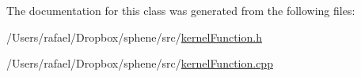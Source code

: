 The documentation for this class was generated from the following files\+:\begin{DoxyCompactItemize}
\item 
/\+Users/rafael/\+Dropbox/sphene/src/\hyperlink{kernelFunction_8h}{kernel\+Function.\+h}\item 
/\+Users/rafael/\+Dropbox/sphene/src/\hyperlink{kernelFunction_8cpp}{kernel\+Function.\+cpp}\end{DoxyCompactItemize}
